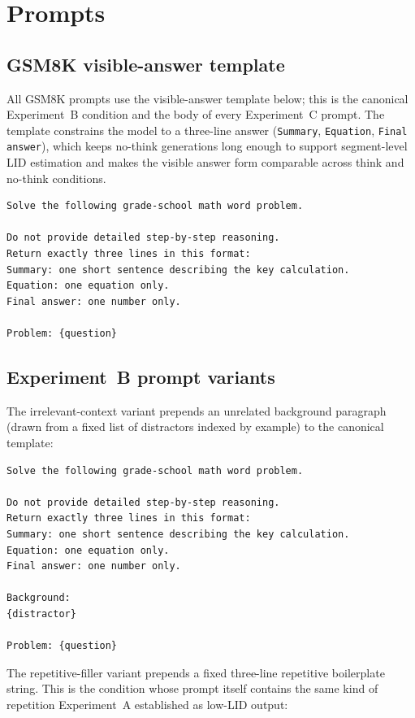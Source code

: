 \documentclass{article}
\theoremstyle{plain}
\theoremstyle{definition}
\theoremstyle{remark}
\begin{document}
\section{Prompts}
\label{app:prompts}

\subsection{GSM8K visible-answer template}

All GSM8K prompts use the visible-answer template below; this is the canonical Experiment~B condition and the body of every Experiment~C prompt. The template constrains the model to a three-line answer (\texttt{Summary}, \texttt{Equation}, \texttt{Final answer}), which keeps no-think generations long enough to support segment-level LID estimation and makes the visible answer form comparable across think and no-think conditions.

\begin{verbatim}
Solve the following grade-school math word problem.

Do not provide detailed step-by-step reasoning.
Return exactly three lines in this format:
Summary: one short sentence describing the key calculation.
Equation: one equation only.
Final answer: one number only.

Problem: {question}
\end{verbatim}

\subsection{Experiment~B prompt variants}

The irrelevant-context variant prepends an unrelated background paragraph (drawn from a fixed list of distractors indexed by example) to the canonical template:

\begin{verbatim}
Solve the following grade-school math word problem.

Do not provide detailed step-by-step reasoning.
Return exactly three lines in this format:
Summary: one short sentence describing the key calculation.
Equation: one equation only.
Final answer: one number only.

Background:
{distractor}

Problem: {question}
\end{verbatim}

The repetitive-filler variant prepends a fixed three-line repetitive boilerplate string. This is the condition whose prompt itself contains the same kind of repetition Experiment~A established as low-LID output:
\end{document}
